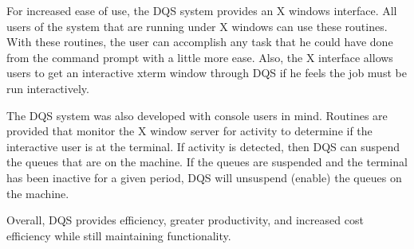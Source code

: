 For increased ease of use, the DQS system provides an X windows
interface.  All users of the system that are running under X windows
can use these routines.  With these routines, the user can
accomplish any task that he could have done from the command prompt
with a little more ease.  Also, the X interface allows users to get an
interactive xterm window through DQS if he feels the job must be run
interactively.

The DQS system was also developed with console users in mind.
Routines are provided that monitor the X window server for activity to
determine if the interactive user is at the terminal.  If activity is
detected, then DQS can suspend the queues that are on the
machine.  If the queues are suspended and the terminal has been inactive for
a given period, DQS will unsuspend (enable) the queues on the machine.

Overall, DQS provides efficiency, greater productivity, and increased
cost efficiency while still maintaining functionality.

